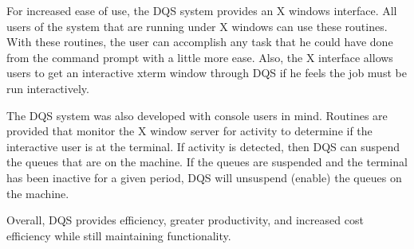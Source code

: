 For increased ease of use, the DQS system provides an X windows
interface.  All users of the system that are running under X windows
can use these routines.  With these routines, the user can
accomplish any task that he could have done from the command prompt
with a little more ease.  Also, the X interface allows users to get an
interactive xterm window through DQS if he feels the job must be run
interactively.

The DQS system was also developed with console users in mind.
Routines are provided that monitor the X window server for activity to
determine if the interactive user is at the terminal.  If activity is
detected, then DQS can suspend the queues that are on the
machine.  If the queues are suspended and the terminal has been inactive for
a given period, DQS will unsuspend (enable) the queues on the machine.

Overall, DQS provides efficiency, greater productivity, and increased
cost efficiency while still maintaining functionality.

